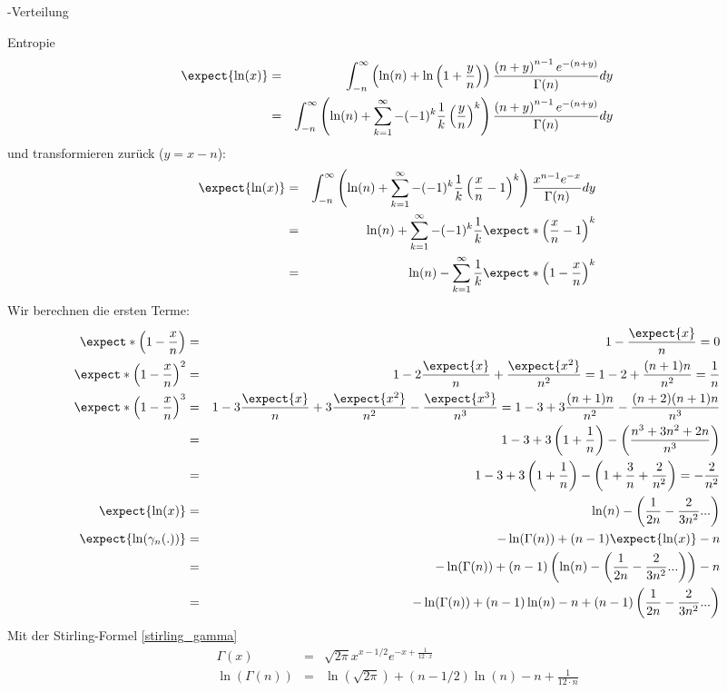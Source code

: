 \begin{chapter}{\titlestr}
\begin{appendix}
\begin{section}{\titlemath{$\Gamma$}-Verteilung}
\begin{subsection}{Entropie}
\begin{eqnarray*}
\expect{\ln(x)} &=& \int_{-n}^\infty \left( \ln(n)+\ln\left(1+\frac{y}{n}\right)\right)\frac{\left(n+y\right)^{n-1}e^{-\left(n+y\right)}}{\Gamma(n)}dy\\
&=& \int_{-n}^\infty \left( \ln(n)+\sum_{k=1}^\infty-(-1)^k\frac{1}{k}\left(\frac{y}{n}\right)^k\right)\frac{\left(n+y\right)^{n-1}e^{-\left(n+y\right)}}{\Gamma(n)}dy
\end{eqnarray*}
und transformieren zurück ($y=x-n$):
\begin{eqnarray*}
\expect{\ln(x)} &=& \int_{-n}^\infty \left( \ln(n)+\sum_{k=1}^\infty-(-1)^k\frac{1}{k}\left(\frac{x}{n}-1\right)^k\right)\frac{x^{n-1}e^{-x}}{\Gamma(n)}dy\\
&=& \ln(n)+\sum_{k=1}^\infty-(-1)^k\frac{1}{k}\expect*{\left(\frac{x}{n}-1\right)^k}\\
&=& \ln(n)-\sum_{k=1}^\infty\frac{1}{k}\expect*{\left(1-\frac{x}{n}\right)^k}
\end{eqnarray*}
Wir berechnen die ersten Terme:
\begin{eqnarray*}
\expect*{\left(1-\frac{x}{n}\right)} &=& 1-\frac{\expect{x}}{n} = 0\\
\expect*{\left(1-\frac{x}{n}\right)^2} &=& 1-2\frac{\expect{x}}{n}+\frac{\expect{x^2}}{n^2}=1-2+\frac{(n+1)n}{n^2}= \frac{1}{n}\\
\expect*{\left(1-\frac{x}{n}\right)^3} &=& 1-3\frac{\expect{x}}{n}+3\frac{\expect{x^2}}{n^2}-\frac{\expect{x^3}}{n^3}=1-3+3\frac{(n+1)n}{n^2}-\frac{(n+2)(n+1)n}{n^3}\\
&=&1-3+3\left(1+\frac{1}{n}\right)-\left(\frac{n^3+3n^2+2n}{n^3}\right)\\
&=&1-3+3\left(1+\frac{1}{n}\right)-\left(1+\frac{3}{n}+\frac{2}{n^2}\right)=-\frac{2}{n^2}\\
\expect{\ln(x)} &=& \ln(n)-\left(\frac{1}{2n}-\frac{2}{3n^2}...\right)\\
\expect{\ln(\gamma_n(.))} &=& -\ln(\Gamma(n))+(n-1)\expect{\ln(x)}-n\\
&=& -\ln(\Gamma(n))+(n-1)\left(\ln(n)-\left(\frac{1}{2n}-\frac{2}{3n^2}...\right)\right)-n\\
&=& -\ln(\Gamma(n))+(n-1)\ln(n)-n+(n-1)\left(\frac{1}{2n}-\frac{2}{3n^2}...\right)
\end{eqnarray*}
Mit der Stirling-Formel \ref{stirling_gamma}
\begin{eqnarray*}
\Gamma(x) &=& \sqrt{2\pi}x^{x-1/2}e^{-x+\frac{1}{12\cdot x}}\\
\ln(\Gamma(n)) &=&\ln(\sqrt{2\pi})+\left(n-1/2\right)\ln(n)-n+\frac{1}{12\cdot n}
\end{eqnarray*}

\end{subsection}
\end{section}
\end{appendix}
\end{chapter}
